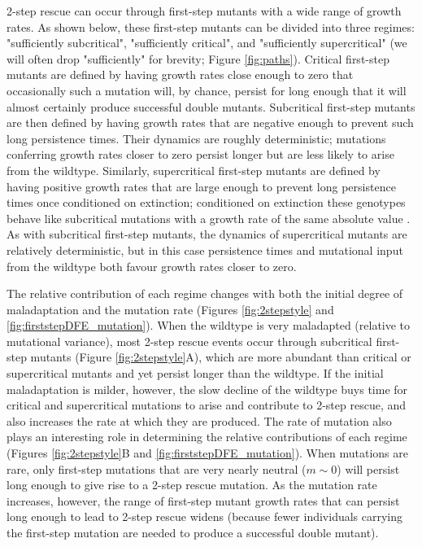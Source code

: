 \documentclass[9pt,twocolumn,twoside,lineno]{gsajnl}
\begin{document}
2-step rescue can occur through first-step mutants with a wide range of growth rates. 
As shown below, these first-step mutants can be divided into three regimes: "sufficiently subcritical", "sufficiently critical", and "sufficiently supercritical" (we will often drop "sufficiently" for brevity; Figure \ref{fig:paths}).  
Critical first-step mutants are defined by having growth rates close enough to zero that occasionally such a mutation will, by chance, persist for long enough that it will almost certainly produce successful double mutants.
Subcritical first-step mutants are then defined by having growth rates that are negative enough to prevent such long persistence times. 
Their dynamics are roughly deterministic; mutations conferring growth rates closer to zero persist longer but are less likely to arise from the wildtype.
Similarly, supercritical first-step mutants are defined by having positive growth rates that are large enough to prevent long persistence times once conditioned on extinction; conditioned on extinction these genotypes behave like subcritical mutations with a growth rate of the same absolute value \citep{maruyama1974note}.
As with subcritical first-step mutants, the dynamics of supercritical mutants are relatively deterministic, but in this case persistence times and mutational input from the wildtype both favour growth rates closer to zero.

The relative contribution of each regime changes with both the initial degree of maladaptation and the mutation rate (Figures \ref{fig:2stepstyle} and \ref{fig:firststepDFE_mutation}).
When the wildtype is very maladapted (relative to mutational variance), most 2-step rescue events occur through subcritical first-step mutants (Figure \ref{fig:2stepstyle}A), which are more abundant than critical or supercritical mutants and yet persist longer than the wildtype.
If the initial maladaptation is milder, however, the slow decline of the wildtype buys time for critical and supercritical mutations to arise and contribute to 2-step rescue, and also increases the rate at which they are produced. 
The rate of mutation also plays an interesting role in determining the relative contributions of each regime (Figures \ref{fig:2stepstyle}B and \ref{fig:firststepDFE_mutation}). 
When mutations are rare, only first-step mutations that are very nearly neutral ($m\sim0$) will persist long enough to give rise to a 2-step rescue mutation. 
As the mutation rate increases, however, the range of first-step mutant growth rates that can persist long enough to lead to 2-step rescue widens (because fewer individuals carrying the first-step mutation are needed to produce a successful double mutant).
\end{document}
